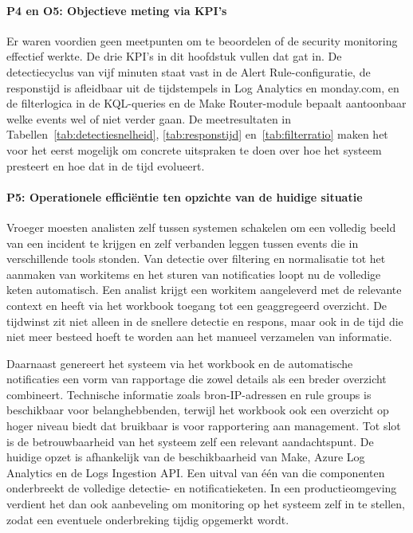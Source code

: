 \paragraph{P4 en O5: Objectieve meting via KPI's}
Er waren voordien geen meetpunten om te beoordelen of de security monitoring effectief werkte. De drie KPI's in dit hoofdstuk vullen dat gat in. De detectiecyclus van vijf minuten staat vast in de Alert Rule-configuratie, de responstijd is afleidbaar uit de tijdstempels in Log Analytics en monday.com, en de filterlogica in de KQL-queries en de Make Router-module bepaalt aantoonbaar welke events wel of niet verder gaan. De meetresultaten in Tabellen~\ref{tab:detectiesnelheid}, \ref{tab:responstijd} en~\ref{tab:filterratio} maken het voor het eerst mogelijk om concrete uitspraken te doen over hoe het systeem presteert en hoe dat in de tijd evolueert.

\paragraph{P5: Operationele efficiëntie ten opzichte van de huidige situatie}
Vroeger moesten analisten zelf tussen systemen schakelen om een volledig beeld van een incident te krijgen en zelf verbanden leggen tussen events die in verschillende tools stonden. Van detectie over filtering en normalisatie tot het aanmaken van workitems en het sturen van notificaties loopt nu de volledige keten automatisch. Een analist krijgt een workitem aangeleverd met de relevante context en heeft via het workbook toegang tot een geaggregeerd overzicht. De tijdwinst zit niet alleen in de snellere detectie en respons, maar ook in de tijd die niet meer besteed hoeft te worden aan het manueel verzamelen van informatie.

Daarnaast genereert het systeem via het workbook en de automatische notificaties een vorm van rapportage die zowel details als een breder overzicht combineert. Technische informatie zoals bron-IP-adressen en rule groups is beschikbaar voor belanghebbenden, terwijl het workbook ook een overzicht op hoger niveau biedt dat bruikbaar is voor rapportering aan management. Tot slot is de betrouwbaarheid van het systeem zelf een relevant aandachtspunt. De huidige opzet is afhankelijk van de beschikbaarheid van Make, Azure Log Analytics en de Logs Ingestion API. Een uitval van één van die componenten onderbreekt de volledige detectie- en notificatieketen. In een productieomgeving verdient het dan ook aanbeveling om monitoring op het systeem zelf in te stellen, zodat een eventuele onderbreking tijdig opgemerkt wordt.

